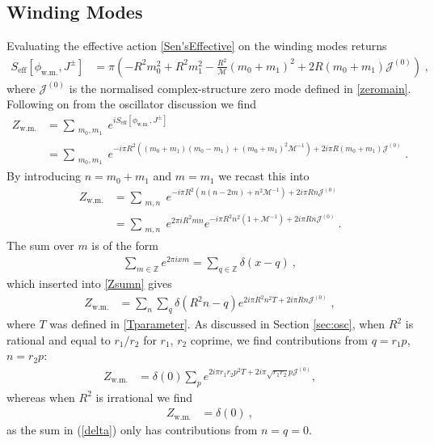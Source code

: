 \documentclass[11pt]{article}
\numberwithin{equation}{section}
\begin{document}
\begin{appendix}
\subsection{Winding Modes}\label{app:wind}

Evaluating the effective action \eqref{Sen'sEffective} on the winding modes returns
\begin{align}
S_{\text{eff}}[\phi_{\text{w.m.}},J^\pm]  &=  \pi \left(   -R^2m_0^2+R^2m_1^2 -  \frac{R^2}{{\mathcal M}}(m_0+m_1)^2 
+2R(m_0+m_1)\mathcal{J}^{(0)} \right)\;,
\end{align}
where $\mathcal{J}^{(0)}$ is the normalised complex-structure zero mode defined in \eqref{zeromain}. Following on from the oscillator discussion we find
\begin{align}
Z_{\text{w.m.}} &= \sum_{\substack{m_0,m_1}} e^{i S_{\text{eff}}[\phi_{\text{w.m.}},J^\pm]}  \nonumber\\
&= \sum_{\substack{m_0,m_1}} e^{-i\pi R^2\left((m_0+m_1)(m_0-m_1)+(m_0+m_1)^2{\mathcal M}^{-1}\right) +2i\pi R (m_0+m_1)\mathcal{J}^{(0)}}\;.
\end{align} By introducing $n=m_0+m_1$ and $m=m_1$ we recast this into
\begin{align}\label{Zsumn}
Z_{\text{w.m.}} &= \sum_{\substack{m,n}}  e^{-i\pi R^2\left(n(n-2m)+n^2{\mathcal M}^{-1}\right) +2i\pi R n\mathcal{J}^{(0)}}\nonumber\\
&= \sum_{\substack{m,n}} e^{2\pi i R^2mn}e^{-i\pi R^2n^2\left(1+{\mathcal M}^{-1}\right) +2i\pi R n\mathcal{J}^{(0)}}\ .
\end{align}
The sum over $m$ is of the form
\begin{align}\label{deltasum}
\sum_{m\in\mathbb{Z}} e^{2 \pi i x m} = \sum_{q\in\mathbb{Z}} \delta(x - q)\ ,
\end{align}
which inserted into \eqref{Zsumn} gives
\begin{align}\label{delta}
Z_{\text{w.m.}} &= \sum_{n} \sum_{q}\delta(R^2n-q) e^{2i\pi R^2n^2T +2i\pi R n\mathcal{J}^{(0)}}\;,
\end{align}
where $T$ was defined in \eqref{Tparameter}. As discussed in Section \ref{sec:osc}, when $R^2$ is rational and equal to $r_1/r_2$ for $r_1$, $r_2$ coprime, we find contributions from $q=r_1p$, $n=r_2 p$:
\begin{align}\label{ZwmFinal}
    Z_{\text{w.m.}}&= \delta(0) \sum_{p} e^{2i\pi r_1r_2 p^2 T +2i\pi \sqrt{r_1r_2} p\mathcal{J}^{(0)}} ,
\end{align}
whereas when $R^2$ is irrational we find
\begin{align}
    Z_{\text{w.m.}}&= \delta(0)\ ,
\end{align}
as the sum  in (\ref{delta}) only has contributions from $n = q = 0$.


\end{appendix}
\end{document}
